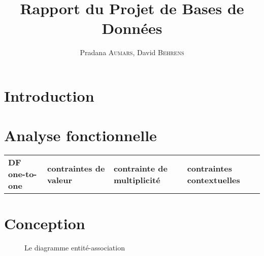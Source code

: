 \documentclass[12pt, a4paper]{article}
\title{Rapport du Projet de Bases de Données}
\author{Pradana \textsc{Aumars}, David \textsc{Behrens}}
\begin{document}
\maketitle
\section{Introduction}
\section{Analyse fonctionnelle}
\begin{table}[h]
\scriptsize
\begin{tabular}{llll}
  \textbf{DF one-to-one} & \textbf{contraintes de valeur} & \textbf{contrainte de multiplicité} & \textbf{contraintes contextuelles} \\
\end{tabular}
\end{table}
\section{Conception}
\begin{figure}[h]

\caption{Le diagramme entité-association}
\end{figure}
\end{document}
